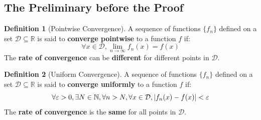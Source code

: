 \documentclass[10pt,UTF8]{article}
\newenvironment{definitionBox}
{
  \begin{tcolorbox}[colback=blue!5!white,colframe=blue!75!black,parbox=false,before
  upper=\par,before lower=\par]}
  {
\end{tcolorbox}}
\theoremstyle{definition}
\newtheorem{definition inner}{Definition}[section]
\newenvironment{definition}[1][]
{
  \begin{definitionBox}
  \begin{definition inner}[#1]\hfill\par}
    {
    \end{definition inner}
\end{definitionBox}}
\theoremstyle{definition}
\newtheorem{theorem inner}{Theorem}[section]
\theoremstyle{definition}
\newtheorem*{proof inner}{\textit{Proof}}
\theoremstyle{plain}
\newtheorem{tip inner}{Tip}[section]
\theoremstyle{remark}
\begin{document}
\subsection{The Preliminary before the Proof}

\begin{definition}[Pointwise Convergence]
  A sequence of functions \( \{f_n\} \) defined on a set
  \(\mathcal{D} \subseteq \mathbb{R}\) is said to
  \textbf{converge pointwise} to a function \(f\) if:
  \begin{equation*}
    \forall x \in \mathcal{D}, \lim_{n\to\infty} f_n(x) = f(x)
  \end{equation*}
  The \textbf{rate of convergence} can be \textbf{different}
  for different points in \(\mathcal{D}\).
\end{definition}

\begin{definition}[Uniform Convergence]
  A sequence of functions \( \{f_n\} \) defined on a set
  \(\mathcal{D} \subseteq \mathbb{R}\) is said to
  \textbf{converge uniformly} to a function \(f\) if:
  \begin{equation*}
    \forall \varepsilon > 0, \exists N \in \mathbb{N}, \forall n > N,
    \forall x \in \mathcal{D}, \abs{f_n(x) - f(x)} < \varepsilon
  \end{equation*}
  The \textbf{rate of convergence} is the \textbf{same} for all points in
  \(\mathcal{D}\).
\end{definition}
\end{document}
